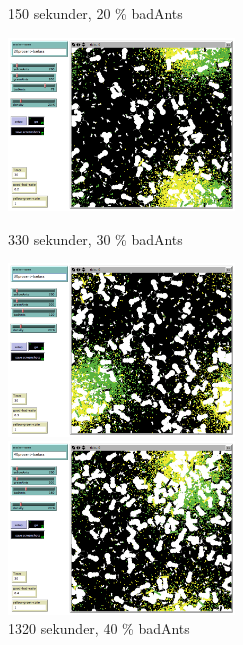\documentclass[titlepage, a4paper, 12pt]{article}
\begin{document}
\begin{figure}
  \begin{minipage}[b]{0.5\linewidth}
    \centering
    \caption{150 sekunder, 20 \% badAnts}\label{fig:first-new}
    \includegraphics[width=6cm]{images/20procent-badass-150.png}
  \end{minipage}
  \begin{minipage}[b]{0.5\linewidth} %
    \centering
    \caption{330 sekunder, 30 \% badAnts}
    \includegraphics[width=6cm]{images/30procent-badass-330.png}
  \end{minipage}
  \hspace{0.5cm} %
  
  \begin{minipage}[b]{0.5\linewidth} %
    \centering
    \caption{1320 sekunder, 40 \% badAnts}\label{fig:last-new}
    \includegraphics[width=6cm]{images/40procent-badass-1320.png}
  \end{minipage}
  \hspace{0.5cm} %
  
  
  
\end{figure}
\end{document}
